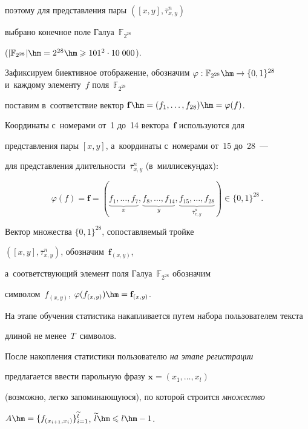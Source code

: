  поэтому для представления пары $([x,y],\overline{\tau}^{n}_{x,y})$ 


 выбрано конечное поле Галуа~$\mathbb{F}_{2^{28}}$


($|\mathbb{F}_{2^{28}}|\hm=2^{28}\hm\geqslant 101^2\cdot 10\;000$). 


Зафиксируем биективное отображение, обозначим $\varphi:\mathbb{F}_{2^{28}}


\hm\rightarrow \{0,1\}^{28}$ и~каждому элементу~$f$ поля~$\mathbb{F}_{2^{28}}$ 


поставим в~соответствие вектор $\mathbf{f}\hm=(f_1,\ldots,f_{28})\hm=\varphi(f)$. 


Координаты с~номерами от~1 до~14 вектора~$\mathbf{f}$ используются для 


представления пары $[x,y]$, а~координаты с~номерами от~15 до~28~--- 


для представления длительности~$\overline{\tau}^{n}_{x,y}$ (в~миллисекундах):


$$


\varphi(f)=\mathbf{f}=(\underbrace{f_1,\ldots,f_7}_{x}, \underbrace{f_8,\ldots,f_{14}}_{y}, 


\underbrace{f_{15},\ldots,f_{28}}_{\overline{\tau}^{n}_{x,y}})\in \{0,1\}^{28}\,.


$$ 


Вектор множества $\{0,1\}^{28}$, сопоставляемый тройке 


$([x,y],\overline{\tau}^{n}_{x,y})$, обозначим~$\mathbf{f}_{(x,y)}$, 


а~соответствующий элемент поля Галуа~$\mathbb{F}_{2^{28}}$ обозначим 


символом~${f}_{(x,y)}$, $\varphi({f}_{(x,y)})\hm=\mathbf{f}_{(x,y)}$. 





На этапе обучения статистика накапливается путем набора пользователем текста 


длиной не менее~$T$~символов.


%


После накопления статистики пользователю \textit{на этапе регистрации} 


предлагается ввести парольную фразу $\mathbf{x}=(x_1,\ldots,x_l)$ 


(возможно, легко за\-по\-ми\-на\-ющу\-юся), по которой строится \textit{множество} 


$A\hm=\{f_{(x_{i+1},x_i)}\}_{i=1}^{\widetilde{l}}$, $\widetilde{l}\hm\leqslant l\hm-1$. 


